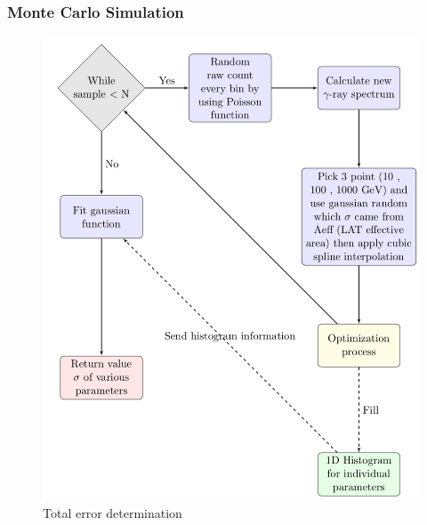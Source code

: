 \documentclass{beamer}
\begin{document}
  \begin{frame}\frametitle{Monte Carlo Simulation}
    \begin{figure}[h!]
      \includegraphics[width=0.65\textheight]{montetot}
      \caption{Total error determination}
      \end{figure}
  \end{frame}
\end{document}
